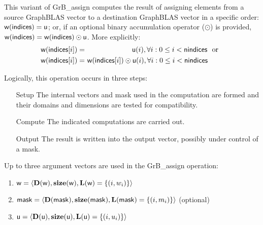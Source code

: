 This variant of {\sf GrB\_assign} computes the result of assigning elements from 
a source GraphBLAS vector to a destination GraphBLAS vector in a specific order: 
${\sf w}({\sf indices}) = {\sf u}$; or, if an optional binary accumulation 
operator ($\odot$) is provided, 
${\sf w}({\sf indices}) = {\sf w}({\sf indices}) \odot {\sf u}$.  
More explicitly:
\[
\begin{aligned}
	{\sf w}({\sf indices}[i]) = &\ \ \ \ \ \ \ \ \ \ \ \ \ \ \ \ \ \ \ \ {\sf u}(i),
    \forall i : 0 \leq i < {\sf nindices} \mbox{~~or~~} \\
    {\sf w}({\sf indices}[i]) = &\ {\sf w}({\sf indices}[i]) \odot {\sf u}(i),
    \forall i : 0 \leq i < {\sf nindices}
\end{aligned}
\]  

Logically, this operation occurs in three steps:
\begin{enumerate}[leftmargin=0.75in]
\item[Setup] The internal vectors and mask used in the computation are formed 
and their domains and dimensions are tested for compatibility.
\item[Compute] The indicated computations are carried out.
\item[Output] The result is written into the output vector, possibly under 
control of a mask.
\end{enumerate}

Up to three argument vectors are used in the {\sf GrB\_assign} operation:
\begin{enumerate}
	\item ${\sf w} = \langle \bold{D}({\sf w}),\bold{size}({\sf w}),
    \bold{L}({\sf w}) = \{(i,w_i) \} \rangle$
    
	\item ${\sf mask} = \langle \bold{D}({\sf mask}),\bold{size}({\sf mask}),
    \bold{L}({\sf mask}) = \{(i,m_i) \} \rangle$ (optional)
    
	\item ${\sf u} = \langle \bold{D}({\sf u}),\bold{size}({\sf u}),
    \bold{L}({\sf u}) = \{(i,u_i) \} \rangle$
\end{enumerate}


